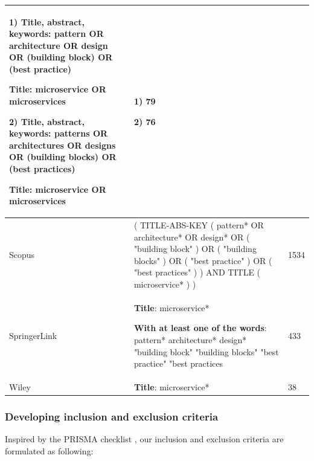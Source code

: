 \documentclass{bmcart}
\begin{document}
\begin{table}[h]
\begin{tabular}{|p{3cm}|p{7cm}|p{1.5cm}|}
        1) \textbf{Title, abstract, keywords}: pattern OR architecture OR design OR (building block) OR (best practice)

           \textbf{Title}: microservice OR microservices

        2) \textbf{Title, abstract, keywords}: patterns OR architectures OR designs OR (building blocks) OR (best practices)

            \textbf{Title}: microservice OR microservices
        & 
        1) 79

        2) 76
        \\ 

        \hline

        Scopus & ( TITLE-ABS-KEY ( pattern*  OR  architecture*  OR  design*  OR  ( "building block" )  OR  ( "building blocks" )  OR  ( "best practice" )  OR  ( "best practices" ) )  AND  TITLE ( microservice* ) ) & 1534 \\ 
        \hline

        SpringerLink & \textbf{Title}: microservice*


        \textbf{With at least one of the words}: pattern* architecture* design* "building block" "building blocks" "best practice" "best practices
         & 433 \\ 
        \hline

        Wiley & \textbf{Title}: microservice* & 38 \\ 

        \hline
    \end{tabular}
    
    \label{searchTerms}
\end{table}


\subsubsection{Developing inclusion and exclusion criteria} \label{incexc}

Inspired by the PRISMA checklist \cite{tricco2018prisma}, our inclusion and exclusion criteria are formulated as following:
\end{document}

